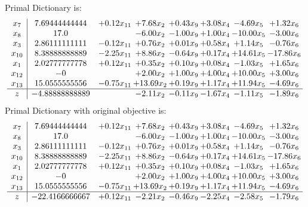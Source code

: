 \documentclass[8pt]{article}
\begin{document}
Primal Dictionary is:
\[\begin{array}{c| c c@{\hskip 2pt} c@{\hskip 2pt} c@{\hskip 2pt} c@{\hskip 2pt} c@{\hskip 2pt} c@{\hskip 2pt} }
 x_{7}   &  7.69444444444 & +  0.12 x_{11} & +  7.68 x_{2} & +  0.43 x_{9} & +  3.08 x_{4} & -4.69 x_{5} & +  1.32 x_{6}\\
 x_{8}   &  17.0  &   & -6.00 x_{2} & -1.00 x_{9} & +  1.00 x_{4} & -10.00 x_{5} & -3.00 x_{6}\\
 x_{3}   &  2.86111111111 & -0.12 x_{11} & +  0.76 x_{2} & +  0.01 x_{9} & +  0.58 x_{4} & +  1.14 x_{5} & -0.76 x_{6}\\
 x_{10}   &  8.38888888889 & -2.25 x_{11} & +  8.86 x_{2} & -0.64 x_{9} & +  0.17 x_{4} & + 14.61 x_{5} & -17.86 x_{6}\\
 x_{1}   &  2.02777777778 & +  0.12 x_{11} & +  0.35 x_{2} & +  0.10 x_{9} & +  0.08 x_{4} & -1.03 x_{5} & +  1.65 x_{6}\\
 x_{12}   &  -0  &   & +  2.00 x_{2} & +  1.00 x_{9} & +  4.00 x_{4} & + 10.00 x_{5} & +  3.00 x_{6}\\
 x_{13}   &  15.0555555556 & -0.75 x_{11} & + 13.69 x_{2} & +  0.19 x_{9} & +  1.17 x_{4} & + 11.94 x_{5} & -4.69 x_{6}\\
\hline
z    &  -4.88888888889  &   & -2.11 x_{2} & -0.11 x_{9} & -1.67 x_{4} & -1.11 x_{5} & -1.89 x_{6}\\
\end{array}\]
Primal Dictionary with original objective is:
\[\begin{array}{c| c c@{\hskip 2pt} c@{\hskip 2pt} c@{\hskip 2pt} c@{\hskip 2pt} c@{\hskip 2pt} c@{\hskip 2pt} }
 x_{7}   &  7.69444444444 & +  0.12 x_{11} & +  7.68 x_{2} & +  0.43 x_{9} & +  3.08 x_{4} & -4.69 x_{5} & +  1.32 x_{6}\\
 x_{8}   &  17.0  &   & -6.00 x_{2} & -1.00 x_{9} & +  1.00 x_{4} & -10.00 x_{5} & -3.00 x_{6}\\
 x_{3}   &  2.86111111111 & -0.12 x_{11} & +  0.76 x_{2} & +  0.01 x_{9} & +  0.58 x_{4} & +  1.14 x_{5} & -0.76 x_{6}\\
 x_{10}   &  8.38888888889 & -2.25 x_{11} & +  8.86 x_{2} & -0.64 x_{9} & +  0.17 x_{4} & + 14.61 x_{5} & -17.86 x_{6}\\
 x_{1}   &  2.02777777778 & +  0.12 x_{11} & +  0.35 x_{2} & +  0.10 x_{9} & +  0.08 x_{4} & -1.03 x_{5} & +  1.65 x_{6}\\
 x_{12}   &  -0  &   & +  2.00 x_{2} & +  1.00 x_{9} & +  4.00 x_{4} & + 10.00 x_{5} & +  3.00 x_{6}\\
 x_{13}   &  15.0555555556 & -0.75 x_{11} & + 13.69 x_{2} & +  0.19 x_{9} & +  1.17 x_{4} & + 11.94 x_{5} & -4.69 x_{6}\\
\hline
z    &  -22.4166666667 & +  0.12 x_{11} & -2.21 x_{2} & -0.46 x_{9} & -2.25 x_{4} & -2.58 x_{5} & -1.79 x_{6}\\
\end{array}\]
\end{document}
